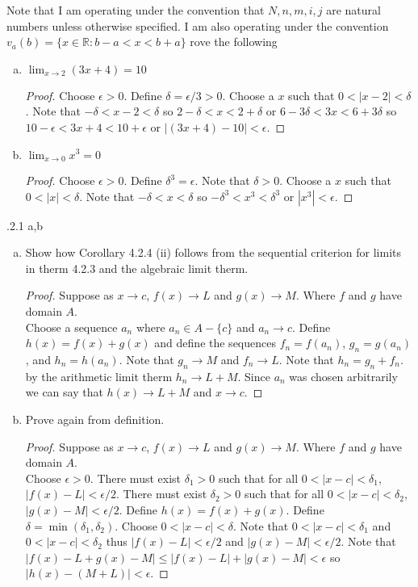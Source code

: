 \documentclass[12pt]{article}
\makeatletter
\theoremstyle{homework}
\newenvironment{exercise}[1]
{\def\@currentlabel{#1}\exercisecore}
{\endexercisecore}
\makeatother
\begin{document}
Note that I am operating under the convention that $N,n,m,i,j$ are natural numbers unless otherwise specified.  I am also operating under the convention $v_a(b)=\{x\in\mathbb{R}:b-a<x<b+a\}$
\begin{exercise}

Prove the following
\end{exercise}
\begin{enumerate}[(a)]
\item
$\lim_{x\rightarrow 2} (3x+4)=10$
\begin{proof}
Choose $\epsilon>0$.  Define $\delta=\epsilon/3>0$.  Choose a $x$ such that $0<|x-2|<\delta$.  Note that $-\delta<x-2<\delta$ so $2-\delta<x<2+\delta$ or $6-3\delta<3x<6+3\delta$ so $10-\epsilon<3x+4<10+\epsilon$ or $|(3x+4)-10|<\epsilon$.
\end{proof}
\item
$\lim_{x\rightarrow 0} x^3=0$
\begin{proof}
Choose $\epsilon>0$.  Define $\delta^3=\epsilon$.  Note that $\delta>0$.  Choose a $x$ such that $0<|x|<\delta$.  Note that $-\delta<x<\delta$ so $-\delta^3<x^3<\delta^3$ or $|x^3|<\epsilon$.
\end{proof}
\end{enumerate}
\begin{exercise}

4.2.1 a,b
\end{exercise}
\begin{enumerate}[(a)]
\item
Show how Corollary 4.2.4 (ii) follows from the sequential criterion for limits in therm 4.2.3 and the algebraic limit therm.\\
\begin{proof}
Suppose as $x\rightarrow c$, $f(x)\rightarrow L$ and $g(x)\rightarrow M$.  Where $f$ and $g$ have domain $A$.\\
Choose a sequence $a_n$ where $a_n\in A-\{c\}$ and $a_n\rightarrow c$.  Define $h(x)=f(x)+g(x)$ and define the sequences $f_n=f(a_n)$, $g_n=g(a_n)$, and $h_n=h(a_n)$.  Note that $g_n\rightarrow M$ and $f_n\rightarrow L$.  Note that $h_n=g_n+f_n$.  by the arithmetic limit therm $h_n\rightarrow L+M$.  Since $a_n$ was chosen arbitrarily we can say that $h(x)\rightarrow L+M$ and $x\rightarrow c$.
\end{proof}
\item
Prove again from definition.
\begin{proof}
Suppose as $x\rightarrow c$, $f(x)\rightarrow L$ and $g(x)\rightarrow M$.  Where $f$ and $g$ have domain $A$.\\
Choose $\epsilon>0$.  There must exist $\delta_1>0$ such that for all $0<|x-c|<\delta_1$, $|f(x)-L|<\epsilon/2$.  There must exist $\delta_2>0$ such that for all $0<|x-c|<\delta_2$, $|g(x)-M|<\epsilon/2$.  Define $h(x)=f(x)+g(x)$.  Define $\delta=\min(\delta_1,\delta_2)$.  Choose $0<|x-c|<\delta$.  Note that $0<|x-c|<\delta_1$ and $0<|x-c|<\delta_2$ thus $|f(x)-L|<\epsilon/2$ and $|g(x)-M|<\epsilon/2$.  Note that $|f(x)-L+g(x)-M|\leq |f(x)-L|+|g(x)-M|<\epsilon$ so $|h(x)-(M+L)|<\epsilon$.
\end{proof}
\end{enumerate}
\end{document}
